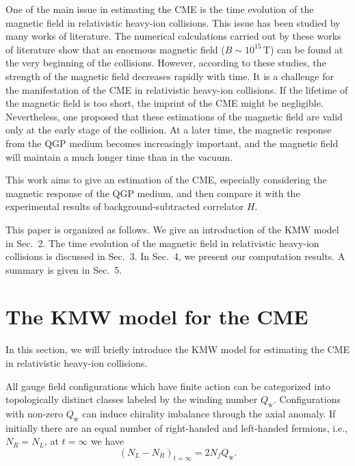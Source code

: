\documentclass[preprint]{elsarticle}
\begin{document}
One of the main issue in estimating the CME is the time evolution of the magnetic field in relativistic heavy-ion collisions.
This issue has been studied by many works of literature\cite{Kharzeev:2007jp,Skokov:2009qp,Voronyuk:2011jd,Bzdak:2011yy,Deng:2012pc,Tuchin:2013apa,Mo:2013qya}. The numerical calculations carried out by these works of literature show that an enormous magnetic field ($B \sim 10^{15}\,\mathrm{T}$) can be found at the very beginning of the collisions.
However, according to these studies, the strength of the magnetic field decreases rapidly with time.
It is a challenge for the manifestation of the CME in relativistic heavy-ion collisions. If the lifetime of the magnetic field is too short, the imprint of the CME might be negligible.
Nevertheless, one proposed that these estimations of the magnetic field are valid only at the early stage of the collision. At a later time, the magnetic response from the QGP medium becomes increasingly important\cite{Tuchin:2010vs,Tuchin:2010vs2,Deng:2012pc,Tuchin:2013apa,McLerran:2013hla,Tuchin:2013ie,Zakharov:2014dia,Tuchin:2014iua,Tuchin:2015oka}, and the magnetic field will maintain a much longer time than in the vacuum.

This work aims to give an estimation of the CME, especially considering the magnetic response of the QGP medium, and then compare it with the experimental results of background-subtracted correlator $H$.

This paper is organized as follows. We give an introduction of the KMW model in Sec.~2. The time evolution of the magnetic field in relativistic heavy-ion collisions is discussed in Sec.~3. In Sec.~4, we present our computation results. A summary is given in Sec.~5.

\section{The KMW model for the CME} \label{KMWmodel}

In this section, we will briefly introduce the KMW model for estimating the CME in relativistic heavy-ion collisions.

All gauge field configurations which have finite action can be categorized into topologically distinct classes labeled by the winding number $Q_\text{w}$. Configurations with non-zero $Q_\text{w}$ can induce chirality imbalance through the axial anomaly. If initially there are an equal number of right-handed and left-handed fermions, i.e., $N_R = N_L$, at $t = \infty$ we have
\begin{equation}
(N_L - N_R)_{t=\infty} = 2N_f Q_\text{w}.
\end{equation}
\end{document}
